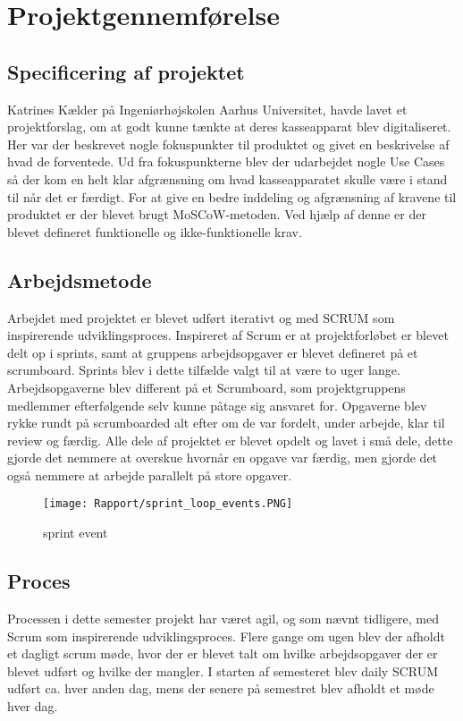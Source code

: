 \section{Projektgennemførelse}
\subsection{Specificering af projektet}
Katrines Kælder på Ingeniørhøjskolen Aarhus Universitet, havde lavet et projektforslag, om at godt kunne tænkte at deres kasseapparat blev digitaliseret. Her var der beskrevet nogle fokuspunkter til produktet og givet en beskrivelse af hvad de forventede. Ud fra fokuspunkterne blev der udarbejdet nogle Use Cases så der kom en helt klar afgrænsning om hvad kasseapparatet skulle være i stand til når det er færdigt.
\newline
\newline
For at give en bedre inddeling og afgrænsning af kravene til produktet er der blevet brugt MoSCoW-metoden. Ved hjælp af denne er der blevet defineret funktionelle og ikke-funktionelle krav.  


\subsection{Arbejdsmetode}
Arbejdet med projektet er blevet udført iterativt og med SCRUM som inspirerende udviklingsproces. Inspireret af Scrum er at projektforløbet er blevet delt op i sprints, samt at gruppens arbejdsopgaver er blevet defineret på et scrumboard. 
\newline
Sprints blev i dette tilfælde valgt til at være to uger lange. Arbejdsopgaverne blev different på et Scrumboard, som projektgruppens medlemmer efterfølgende selv kunne påtage sig ansvaret for. Opgaverne blev rykke rundt på scrumboarded alt efter om de var fordelt, under arbejde, klar til review og færdig. 
\newline
\newline
Alle dele af projektet er blevet opdelt og lavet i små dele, dette gjorde det nemmere at overskue hvornår en opgave var færdig, men gjorde det også nemmere at arbejde parallelt på store opgaver. 

\begin{figure}[H]
	\centering
	\texttt{[image: Rapport/sprint\_loop\_events.PNG]}
	\caption{sprint event}
	\label{fig:sprint}
\end{figure} 

\subsection{Proces}
Processen i dette semester projekt har været agil, og som nævnt tidligere, med Scrum som inspirerende udviklingsproces.
\newline
\newline
Flere gange om ugen blev der afholdt et dagligt scrum møde, hvor der er blevet talt om hvilke arbejdsopgaver der er blevet udført og hvilke der mangler. I starten af semesteret blev daily SCRUM udført ca. hver anden dag, mens der senere på semestret blev afholdt et møde hver dag. 



